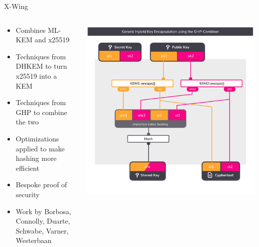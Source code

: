\begin{frame}{X-Wing \citeXwing}
  \begin{columns}[c]
    \begin{column}{.4\linewidth}
      \small
      \begin{itemize}
        \item Combines ML-KEM and x25519
        \item Techniques from DHKEM to turn x25519 into a KEM
        \item Techniques from GHP to combine the two
        \item Optimizations applied to make hashing more efficient
        \item Bespoke proof of security
        \item Work by Borbosa, Connolly, Duarte, Schwabe, Varner, Westerbaan
      \end{itemize}
    \end{column}

    \begin{column}{.6\linewidth}
      \includegraphics[height=.92\textheight,page=3,clip=true,trim={0.5cm 1cm 0.7cm 1.5cm}]{graphics/rosenpass-encapsulation-combiner.pdf}
    \end{column}

  \end{columns}
\end{frame}

